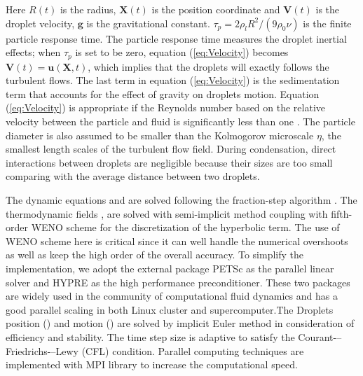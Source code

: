 Here $R(t)$ is the radius, $\mathbf{X}(t)$ is the position coordinate and
$\mathbf{V}(t)$ is the droplet velocity, $\mathbf{g}$ is the gravitational
constant. $\tau_{p}=2\rho_{l}R^{2}/(9\rho_{0}\nu)$ is the finite particle
response time. The particle response time measures the droplet inertial
effects; when $\tau_{p}$ is set to be zero, equation (\ref{eq:Velocity})
becomes $\mathbf{V}(t)=\mathbf{u}(\mathbf{X},t)$, which implies that the
droplets will exactly follows the turbulent flows. The last term in equation
(\ref{eq:Velocity}) is the sedimentation term that accounts for the effect of
gravity on droplets motion. Equation (\ref{eq:Velocity}) is appropriate if the
Reynolds number based on the relative velocity between the particle and fluid
is significantly less than one \cite{Eaton94}. The particle diameter is also
assumed to be smaller than the Kolmogorov microscale $\eta$, the smallest
length scales of the turbulent flow field. During condensation, direct
interactions between droplets are negligible because their sizes are too small
comparing with the average distance between two droplets.

The dynamic equations  and  are solved following the
fraction-step algorithm \cite{Brown2001}. The thermodynamic fields
,  are solved with semi-implicit method coupling with
fifth-order WENO scheme for the discretization of the hyperbolic term. The use
of WENO scheme here is critical since it can well handle the numerical
overshoots as well as keep the high order of the overall accuracy. To simplify
the implementation, we adopt the external package PETSc \cite{petsc_cite} as
the parallel linear solver and HYPRE \cite{hypre_cite} as the high performance
preconditioner. These two packages are widely used in the community of
computational fluid dynamics and has a good parallel scaling in both Linux
cluster and supercomputer.The Droplets position () and motion
() are solved by implicit Euler method in consideration of
efficiency and stability. The time step size is adaptive to satisfy the
Courant-–Friedrichs-–Lewy (CFL) condition. Parallel computing techniques are
implemented with MPI library to increase the computational speed.

